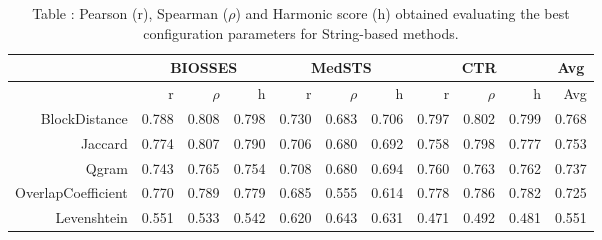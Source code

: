 \begin{table}[!h]
\centering
\caption{Table \label{table:Bestconfiguration_StringMethods}: Pearson (r), Spearman ($\rho$) and Harmonic score (h) obtained evaluating the best configuration parameters for String-based methods.} 
\begingroup\tiny
\begin{tabular}{rrrrrrrrrrr}
  \hline \multicolumn{1}{c}{ } & \multicolumn{3}{c}{BIOSSES} & \multicolumn{3}{c}{MedSTS} & \multicolumn{3}{c}{CTR} & \multicolumn{1}{c}{Avg} \\  \hline
 & r & $\rho$ & h & r & $\rho$ & h & r & $\rho$ & h & Avg \\ 
  \hline
BlockDistance & 0.788 & 0.808 & 0.798 & 0.730 & 0.683 & 0.706 & 0.797 & 0.802 & 0.799 & 0.768 \\ 
  Jaccard & 0.774 & 0.807 & 0.790 & 0.706 & 0.680 & 0.692 & 0.758 & 0.798 & 0.777 & 0.753 \\ 
  Qgram & 0.743 & 0.765 & 0.754 & 0.708 & 0.680 & 0.694 & 0.760 & 0.763 & 0.762 & 0.737 \\ 
  OverlapCoefficient & 0.770 & 0.789 & 0.779 & 0.685 & 0.555 & 0.614 & 0.778 & 0.786 & 0.782 & 0.725 \\ 
  Levenshtein & 0.551 & 0.533 & 0.542 & 0.620 & 0.643 & 0.631 & 0.471 & 0.492 & 0.481 & 0.551 \\ 
   \hline
\end{tabular}
\endgroup
\end{table}

